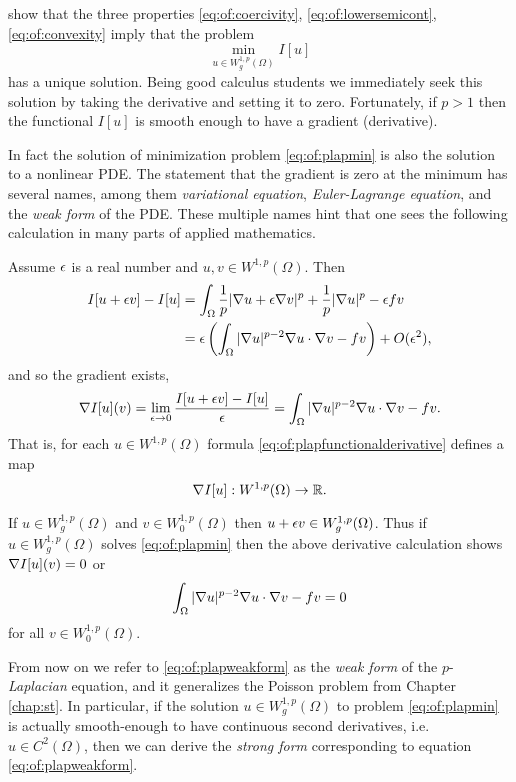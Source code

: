 \citet{KinderlehrerStampacchia1980} show that the three properties \eqref{eq:of:coercivity}, \eqref{eq:of:lowersemicont}, \eqref{eq:of:convexity} imply that the problem
\begin{equation}
\min_{u \in W_g^{1,p}(\Omega)} I[u] \label{eq:of:plapmin}
\end{equation}
has a unique solution.  Being good calculus students we immediately seek this solution by taking the derivative and setting it to zero.  Fortunately, if $p>1$ then the functional $I[u]$ is smooth enough to have a gradient (derivative).

In fact the solution of minimization problem \eqref{eq:of:plapmin} is also the solution to a nonlinear PDE.  The statement that the gradient is zero at the minimum has several names, among them \emph{variational equation}, \emph{Euler-Lagrange equation}, and the \emph{weak form} of the PDE.  These multiple names hint that one sees the following calculation in many parts of applied mathematics.

Assume $\epsilon$ is a real number and $u,v \in W^{1,p}(\Omega)$.  Then
\begin{align*}
I[u+\epsilon v] - I[u] &= \int_\Omega \frac{1}{p} |\nabla u + \epsilon \nabla v|^p + \frac{1}{p} |\nabla u|^p - \epsilon f v \\
   &= \epsilon \left(\int_\Omega |\nabla u|^{p-2} \nabla u \cdot \nabla v - f v\right) + O(\epsilon^2),
\end{align*}
and so the gradient exists,
\begin{equation}
\nabla I[u](v) = \lim_{\epsilon\to 0} \frac{I[u+\epsilon v] - I[u]}{\epsilon} = \int_\Omega |\nabla u|^{p-2} \nabla u \cdot \nabla v - f v. \label{eq:of:plapfunctionalderivative}
\end{equation}
That is, for each $u \in W^{1,p}(\Omega)$ formula \eqref{eq:of:plapfunctionalderivative} defines a map
   $$\nabla I[u] : W^{1,p}(\Omega) \to \mathbb{R}.$$

If $u \in W_g^{1,p}(\Omega)$ and $v\in W_0^{1,p}(\Omega)$ then $u+\epsilon v\in W_g^{1,p}(\Omega)$.  Thus if $u \in W_g^{1,p}(\Omega)$ solves \eqref{eq:of:plapmin} then the above derivative calculation shows $\nabla I[u](v)=0$ or
\begin{equation}
\int_\Omega |\nabla u|^{p-2} \nabla u \cdot \nabla v - f v = 0 \label{eq:of:plapweakform}
\end{equation}
for all $v\in W_0^{1,p}(\Omega)$.

From now on we refer to \eqref{eq:of:plapweakform} as the \emph{weak form} of the $p$-\emph{Laplacian} equation, and it generalizes the Poisson problem from Chapter \ref{chap:st}.  In particular, if the solution $u \in W_g^{1,p}(\Omega)$ to problem \eqref{eq:of:plapmin} is actually smooth-enough to have continuous second derivatives, i.e.~$u \in C^2(\Omega)$, then we can derive the \emph{strong form} corresponding to equation \eqref{eq:of:plapweakform}.

